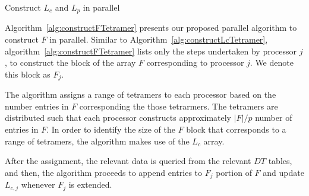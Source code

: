 \documentclass{article}[11pt]
\begin{document}
\begin{algorithm}[H]
\caption{Construct $L_c$ and $L_p$ in parallel}
\label{alg:constructLcTetramer}
\end{algorithm}


Algorithm~\ref{alg:constructFTetramer} presents our proposed parallel algorithm to construct $F$ in parallel.
Similar to Algorithm~\ref{alg:constructLcTetramer}, algorithm~\ref{alg:constructFTetramer} lists only the steps undertaken by processor $j$, to construct the block of the array $F$ corresponding to processor $j$. We denote this block as $F_j$. 

The algorithm assigns a range of tetramers to each processor based on the number entries in $F$ corresponding the those tetrarmers. 
The tetramers are distributed such that each processor constructs approximately $|F|/p$ number of entries in $F$. 
In order to identify the size of the $F$ block that corresponds to a range of tetramers, the algorithm makes use of the $L_c$ array.

After the assignment, the relevant data is queried from the relevant $DT$ tables, and then, the algorithm proceeds to append entries to $F_j$ portion of $F$ and update $L_{c,j}$ whenever $F_j$ is extended.
\end{document}
